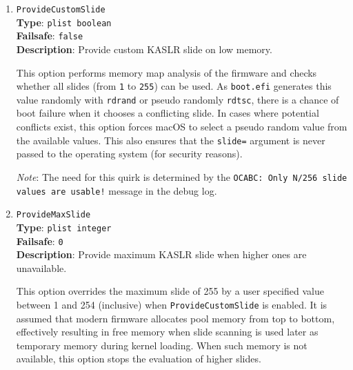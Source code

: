 \documentclass[]{article}
\begin{document}
\begin{enumerate}
  Some modern firmware, including on virtual machines such as VMware,
  may update pointers to UEFI services during driver loading and related actions.
  Consequently, this directly obstructs other quirks that affect memory management,
  such as \texttt{DevirtualiseMmio}, \texttt{ProtectMemoryRegions}, or \texttt{RebuildAppleMemoryMap},
  and may also obstruct other quirks depending on the scope of such.

  GRUB Shim makes similar on-the-fly changes to various UEFI image services,
  which are also protected against by this quirk.

  \emph{Note 1}: On VMware, the need for this quirk may be determined by the appearance of the
  ``Your Mac OS guest might run unreliably with more than one virtual core.'' message.

  \emph{Note 2}: This quirk is needed for correct operation if OpenCore is chainloaded from GRUB
  with BIOS Secure Boot enabled.

\item
  \texttt{ProvideCustomSlide}\\
  \textbf{Type}: \texttt{plist\ boolean}\\
  \textbf{Failsafe}: \texttt{false}\\
  \textbf{Description}: Provide custom KASLR slide on low memory.

  This option performs memory map analysis of the firmware and checks whether
  all slides (from \texttt{1} to \texttt{255}) can be used. As \texttt{boot.efi}
  generates this value randomly with \texttt{rdrand} or pseudo randomly \texttt{rdtsc},
  there is a chance of boot failure when it chooses a conflicting slide. In cases where
  potential conflicts exist, this option forces macOS to select a pseudo random value
  from the available values. This also ensures that the \texttt{slide=} argument is
  never passed to the operating system (for security reasons).

  \emph{Note}: The need for this quirk is determined by the \texttt{OCABC: Only N/256
  slide values are usable!} message in the debug log.

\item
  \texttt{ProvideMaxSlide}\\
  \textbf{Type}: \texttt{plist\ integer}\\
  \textbf{Failsafe}: \texttt{0}\\
  \textbf{Description}: Provide maximum KASLR slide when higher ones are unavailable.

  This option overrides the maximum slide of 255 by a user specified value between 1 and 254
  (inclusive) when \texttt{ProvideCustomSlide} is enabled. It is assumed that modern firmware
  allocates pool memory from top to bottom, effectively resulting in free memory when slide
  scanning is used later as temporary memory during kernel loading. When such memory is not
  available, this option stops the evaluation of higher slides.


\end{enumerate}
\end{document}
